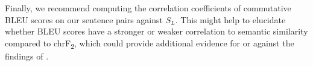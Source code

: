 \documentclass[11pt,a4paper]{article}
\begin{document}
Finally, we recommend computing the correlation coefficients of commutative BLEU
scores on our sentence pairs against $S_L$. This might help to elucidate whether
BLEU scores have a stronger or weaker correlation to semantic similarity
compared to chrF\textsubscript{2}, which could provide additional evidence for
or against the findings of \citet{michel2019evaluation}.




\end{document}
